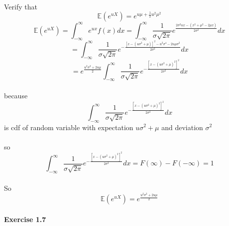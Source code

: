 \documentclass{article}
\begin{document}
\paragraph{}{Verify that
\begin{displaymath}
\mathbb{E}(e^{uX})=e^{u\mu+\frac{1}{2}u^{2}\mu^{2}}
\end{displaymath}}
\begin{displaymath}
\mathbb{E}(e^{uX})=\int_{-\infty}^{\infty}e^{ux}f(x)dx=\int_{-\infty}^{\infty}\frac{1}{\sigma\sqrt{2\pi}}e^{\frac{2\sigma^{2}ux-(x^{2}+\mu^{2}-2\mu x)}{2\sigma ^ {2}}}dx
\end{displaymath}
\begin{displaymath}
=\int_{-\infty}^{\infty}\frac{1}{\sigma\sqrt{2\pi}}e^{-\frac{[x-(u\sigma^{2}+\mu)]^{2}-u^{2}\sigma^4-2u\mu\sigma^{2}}{2\sigma ^2}}dx
\end{displaymath}
\begin{displaymath}
=e^{\frac{u^{2}\sigma^{2}+2u\mu}{2}}\int_{-\infty}^{\infty}\frac{1}{\sigma\sqrt{2\pi}}e^{-\frac{[x-(u\sigma^{2}+\mu)^{2}]^{2}}{2\sigma^{2}}}dx
\end{displaymath}
\paragraph{}{because \begin{displaymath}
                      \int_{-\infty}^{\infty}\frac{1}{\sigma\sqrt{2\pi}}e^{-\frac{[x-(u\sigma^{2}+\mu)^{2}]^{2}}{2\sigma^{2}}}dx
                    \end{displaymath} is cdf of random variable with expectation $u\sigma^{2}+\mu$ and deviation $\sigma^{2}$}
\paragraph{}{so \begin{displaymath}
                \int_{-\infty}^{\infty}\frac{1}{\sigma\sqrt{2\pi}}e^{-\frac{[x-(u\sigma^{2}+\mu)^{2}]^{2}}{2\sigma^{2}}}dx=F(\infty)-F(-\infty)=1
              \end{displaymath}}
\paragraph{}{So \begin{displaymath}
                \mathbb{E}(e^{uX})=e^{\frac{u^{2}\sigma^{2}+2u\mu}{2}}
              \end{displaymath}}

\paragraph{Exercise 1.7 }
\end{document}
